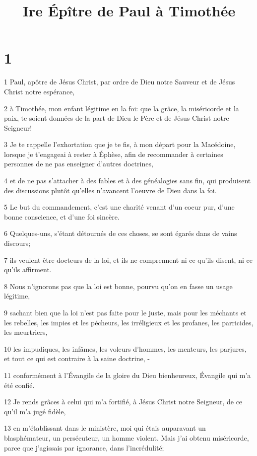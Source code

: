 

\title{Ire Épître de Paul à Timothée}


\chapter{1}

\par 1 Paul, apôtre de Jésus Christ, par ordre de Dieu notre Sauveur et de Jésus Christ notre espérance,
\par 2 à Timothée, mon enfant légitime en la foi: que la grâce, la miséricorde et la paix, te soient données de la part de Dieu le Père et de Jésus Christ notre Seigneur!
\par 3 Je te rappelle l'exhortation que je te fis, à mon départ pour la Macédoine, lorsque je t'engageai à rester à Éphèse, afin de recommander à certaines personnes de ne pas enseigner d'autres doctrines,
\par 4 et de ne pas s'attacher à des fables et à des généalogies sans fin, qui produisent des discussions plutôt qu'elles n'avancent l'oeuvre de Dieu dans la foi.
\par 5 Le but du commandement, c'est une charité venant d'un coeur pur, d'une bonne conscience, et d'une foi sincère.
\par 6 Quelques-uns, s'étant détournés de ces choses, se sont égarés dans de vains discours;
\par 7 ils veulent être docteurs de la loi, et ils ne comprennent ni ce qu'ils disent, ni ce qu'ils affirment.
\par 8 Nous n'ignorons pas que la loi est bonne, pourvu qu'on en fasse un usage légitime,
\par 9 sachant bien que la loi n'est pas faite pour le juste, mais pour les méchants et les rebelles, les impies et les pécheurs, les irréligieux et les profanes, les parricides, les meurtriers,
\par 10 les impudiques, les infâmes, les voleurs d'hommes, les menteurs, les parjures, et tout ce qui est contraire à la saine doctrine, -
\par 11 conformément à l'Évangile de la gloire du Dieu bienheureux, Évangile qui m'a été confié.
\par 12 Je rends grâces à celui qui m'a fortifié, à Jésus Christ notre Seigneur, de ce qu'il m'a jugé fidèle,
\par 13 en m'établissant dans le ministère, moi qui étais auparavant un blasphémateur, un persécuteur, un homme violent. Mais j'ai obtenu miséricorde, parce que j'agissais par ignorance, dans l'incrédulité;
